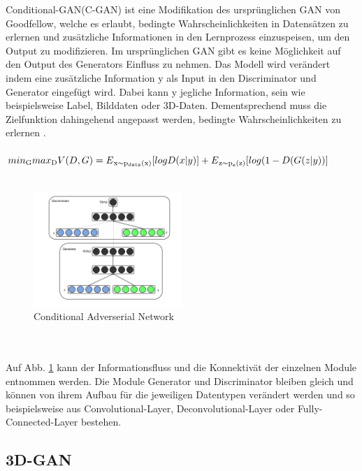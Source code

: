 \documentclass{llncs}
\begin{document}
Conditional-GAN(C-GAN) ist eine Modifikation des ursprünglichen GAN von Goodfellow, welche es erlaubt, bedingte Wahrscheinlichkeiten in Datensätzen zu erlernen und zusätzliche Informationen in den Lernprozess einzuspeisen, um den Output zu modifizieren. Im ursprünglichen GAN gibt es keine Möglichkeit auf den Output des Generators Einfluss zu nehmen. Das Modell wird verändert indem eine zusätzliche Information y als Input in den Discriminator und Generator eingefügt wird. Dabei kann y jegliche Information, sein wie beispielsweise Label, Bilddaten oder 3D-Daten. Dementsprechend muss die Zielfunktion dahingehend angepasst werden, bedingte Wahrscheinlichkeiten zu erlernen \cite{cgan}. 
\\\\
\begin{math}
min\textsubscript{G} max\textsubscript{D}V(D,G)=E\textsubscript{x$\sim$p\textsubscript{data}(x)}[logD(x|y)]  + E\textsubscript{z$\sim$p\textsubscript{z}(z)}[log(1-D(G(z|y))]          
\end{math}
\\\\
\begin{figure}[htbp] 
	\centering
	\includegraphics[width=0.5\textwidth]{cgan.png}
	\caption{Conditional Adverserial Network\protect\cite{cgan}}
	\label{fig:Bild38}
\end{figure}
\\\\
Auf Abb. \ref{fig:Bild38} kann der Informationsfluss und die Konnektivät der einzelnen Module entnommen werden. Die Module Generator und Discriminator bleiben gleich und können von ihrem Aufbau für die jeweiligen Datentypen verändert werden und so beispielsweise aus Convolutional-Layer, Deconvolutional-Layer oder Fully-Connected-Layer bestehen.
\newpage
\subsection{3D-GAN}\label{sec:3dgan}
\end{document}
